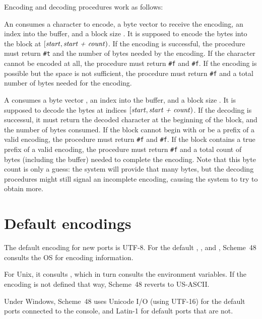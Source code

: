 Encoding and decoding procedures work as follows:
%
\begin{protos}
\end{protos}
%
An  consumes a character  to encode, a
byte vector  to receive the encoding, an index 
into the buffer, and a block size .  It is supposed to
encode the bytes into the block at $\left[\textnormal{\textit{start}}, \textnormal{\textit{start +
    count}}\right)$.  If the encoding is successful, the procedure must
return \texttt{\#t} and the number of bytes needed by the encoding.
If the character cannot be encoded at all, the procedure must return
\texttt{\#f} and \texttt{\#f}.  If the encoding is possible but the
space is not sufficient, the procedure must return \texttt{\#f} and a
total number of bytes needed for the encoding.

A  consumes a byte vector , an index
 into the buffer, and a block size .  It is
supposed to decode the bytes at indices $\left[\textnormal{\textit{start}}, \textnormal{\textit{start
    + count}}\right)$.  If the decoding is successul, it must return
the decoded character at the beginning of the block, and the number of
bytes consumed.  If the block cannot begin with or be a prefix of a
valid encoding, the procedure must return \texttt{\#f} and
\texttt{\#f}.  If the block contains a true prefix of a valid
encoding, the procedure must return \texttt{\#f} and a total count of
bytes (including the buffer) needed to complete the encoding.  Note
that this byte count is only a guess: the system will provide that
many bytes, but the decoding procedures might still signal an
incomplete encoding, causing the system to try to obtain more. 

\section{Default encodings}

The default encoding for new ports is UTF-8.  For the default
, , and
, Scheme~48 consults the OS for encoding
information.

For Unix, it consults , which in turn consults
the  environment variables.  If the encoding is not defined
that way, Scheme~48 reverts to US-ASCII.

Under Windows, Scheme~48 uses Unicode I/O (using UTF-16) for the
default ports connected to the console, and Latin-1 for default ports
that are not.

